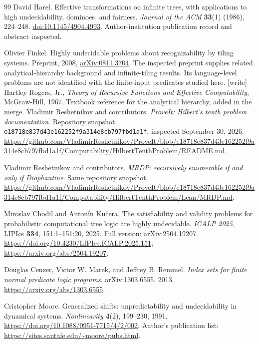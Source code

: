 \documentclass[11pt,letterpaper]{article}
\theoremstyle{definition}
\theoremstyle{remark}
\newcommand{\code}[1]{\texttt{#1}}
\newcommand{\1}{\mathbf 1}
\newcommand{\wtag}{\textup{[write]}}%
\begin{document}
\begin{thebibliography}{99}
David Harel.
Effective transformations on infinite trees, with applications to high
undecidability, dominoes, and fairness.
\emph{Journal of the ACM} \textbf{33}(1) (1986), 224--248.
\href{https://doi.org/10.1145/4904.4993}{doi:10.1145/4904.4993}.
Author-institution publication record and abstract inspected.

Olivier Finkel.
Highly undecidable problems about recognizability by tiling systems.
Preprint, 2008, \href{https://arxiv.org/abs/0811.3704}{arXiv:0811.3704}.
The inspected preprint supplies related analytical-hierarchy background and
infinite-tiling results. Its language-level problems are not identified with
the finite-input predicates studied here.
\wtag{} Hartley Rogers, Jr., \emph{Theory of Recursive Functions and Effective Computability},
McGraw-Hill, 1967. Textbook reference for the analytical hierarchy, added in the merge.
Vladimir Reshetnikov and contributors.
\emph{ProveIt: Hilbert's tenth problem documentation}.
Repository snapshot \code{e18718e837d43e162252f9a314e8cb797fbd1a1f},
inspected September 30, 2026.
\url{https://github.com/VladimirReshetnikov/ProveIt/blob/e18718e837d43e162252f9a314e8cb797fbd1a1f/Computability/HilbertTenthProblem/README.md}.

Vladimir Reshetnikov and contributors.
\emph{MRDP: recursively enumerable if and only if Diophantine}.
Same repository snapshot.
\url{https://github.com/VladimirReshetnikov/ProveIt/blob/e18718e837d43e162252f9a314e8cb797fbd1a1f/Computability/HilbertTenthProblem/Lean/MRDP.md}.

Miroslav Chodil and Anton\'in Ku\v{c}era.
The satisfiability and validity problems for probabilistic computational tree
logic are highly undecidable.
\emph{ICALP 2025}, LIPIcs \textbf{334}, 151:1--151:20, 2025.
Full version: arXiv:2504.19207.
\url{https://doi.org/10.4230/LIPIcs.ICALP.2025.151};
\url{https://arxiv.org/abs/2504.19207}.

Douglas Cenzer, Victor W. Marek, and Jeffrey B. Remmel.
\emph{Index sets for finite normal predicate logic programs}.
arXiv:1303.6555, 2013.
\url{https://arxiv.org/abs/1303.6555}.

Cristopher Moore.
Generalized shifts: unpredictability and undecidability in dynamical systems.
\emph{Nonlinearity} \textbf{4}(2), 199--230, 1991.
\url{https://doi.org/10.1088/0951-7715/4/2/002}.
Author's publication list:
\url{https://sites.santafe.edu/~moore/pubs.html}.


\end{thebibliography}
\end{document}
